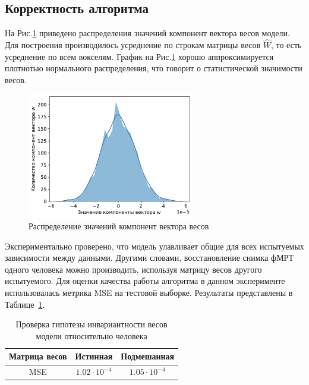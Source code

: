 \documentclass[12pt,twoside]{article}
\begin{document}
\subsection{Корректность алгоритма}
На Рис.\ref{fig:6} приведено распределения значений компонент вектора весов модели. 
Для построения производилось усреднение по строкам матрицы весов $\hat{W}$, то есть усреднение по всем вокселям.
График на Рис.\ref{fig:6} хорошо аппроксимируется плотнотью нормального распределения, что говорит о статистической значимости весов.
\begin{figure}[h!]
    \centering
    \includegraphics[width=0.65\textwidth]{mean_weight_distribution.pdf}
    \caption{Распределение значений компонент вектора весов}
    \label{fig:6}
\end{figure}

Экспериментально проверено, что модель улавливает общие для всех испытуемых зависимости между данными.
Другими словами, восстановление снимка фМРТ одного человека можно производить, используя
матрицу весов другого испытуемого. 
Для оценки качества работы алгоритма в данном эксперименте использовалась метрика MSE на тестовой выборке.
Результаты представлены в Таблице~\ref{table_2}.

	\begin{table}[h!]
		\centering
		\begin{tabular}{|c|c|c|}
			\hline
			Матрица весов	&	Истинная	&	Подмешанная \\ \hline \hline
			MSE		& 	$1.02 \cdot 10^{-4}$	 &		$1.05 \cdot 10^{-4}$ \\ \hline
		\end{tabular}
		\caption{Проверка гипотезы инвариантности весов модели относительно человека}
		\label{table_2}
	\end{table}
\end{document}
